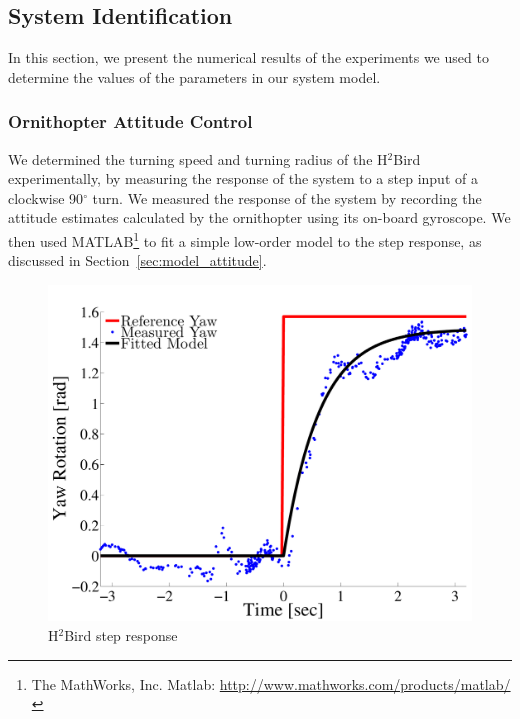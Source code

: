 \documentclass{aamas2013}
\begin{document}
\subsection{System Identification}

In this section, we present the numerical results of the experiments we used to 
determine the values of the parameters in our system model. 

\subsubsection{Ornithopter Attitude Control}
\label{sec:flight_control}
We determined the turning speed and turning radius of the H$^2$Bird 
experimentally, by measuring the response of the system to a step input of a 
clockwise 90$^{\circ}$ turn. We measured the response of the system by 
recording the attitude estimates calculated by the ornithopter using its 
on-board gyroscope. We then used MATLAB\footnote{The MathWorks, Inc. Matlab:
\href{http://www.mathworks.com/products/matlab/}
     {http://www.mathworks.com/products/matlab/}} 
to fit a simple low-order model to the step response, as discussed in 
Section~\ref{sec:model_attitude}.

\begin{figure}[tb]
\centering
\includegraphics[width=\linewidth]{figures/step_response_total.pdf}
\caption{H$^2$Bird step response}
\label{fig:step_response}
\end{figure}
\end{document}
